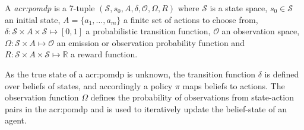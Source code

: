 \begin{definition}
	\label{def:pomdp}
	A \textit{\acrfull{acr:pomdp}} is a 7-tuple $(\mathcal{S}, s_0, A, \delta, \mathcal{O}, \Omega, R)$ where $\mathcal{S}$ is a state space, $s_0 \in \mathcal{S}$ an initial state, $A = \{a_1, \ldots, a_m\}$ a finite set of actions to choose from, $\delta: \mathcal{S} \times A \times \mathcal{S} \mapsto [0, 1]$ a probabilistic transition function, $\mathcal{O}$ an observation space, $\Omega: \mathcal{S}\times A \mapsto \mathcal{O}$ an emission or observation probability function and $R: \mathcal{S} \times A \times \mathcal{S} \mapsto \mathbb{R}$ a reward function.
\end{definition}

As the true state of a \acrshort{acr:pomdp} is unknown, the transition function $\delta$ is defined over beliefs of states, and accordingly a policy $\pi$ maps beliefs to actions.
The observation function $\Omega$ defines the probability of observations from state-action pairs in the \acrshort{acr:pomdp} and is used to iteratively update the belief-state of an agent.



